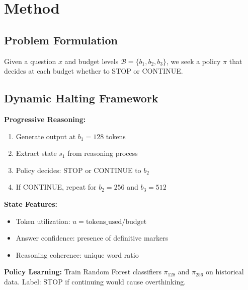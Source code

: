 \section{Method}

\subsection{Problem Formulation}

Given a question $x$ and budget levels $\mathcal{B} = \{b_1, b_2, b_3\}$, we seek a policy $\pi$ that decides at each budget whether to STOP or CONTINUE.

\subsection{Dynamic Halting Framework}

\textbf{Progressive Reasoning:}
\begin{enumerate}
\item Generate output at $b_1 = 128$ tokens
\item Extract state $s_1$ from reasoning process
\item Policy decides: STOP or CONTINUE to $b_2$
\item If CONTINUE, repeat for $b_2 = 256$ and $b_3 = 512$
\end{enumerate}

\textbf{State Features:}
\begin{itemize}
\item Token utilization: $u = \text{tokens\_used} / \text{budget}$
\item Answer confidence: presence of definitive markers
\item Reasoning coherence: unique word ratio
\end{itemize}

\textbf{Policy Learning:}
Train Random Forest classifiers $\pi_{128}$ and $\pi_{256}$ on historical data.
Label: STOP if continuing would cause overthinking.
